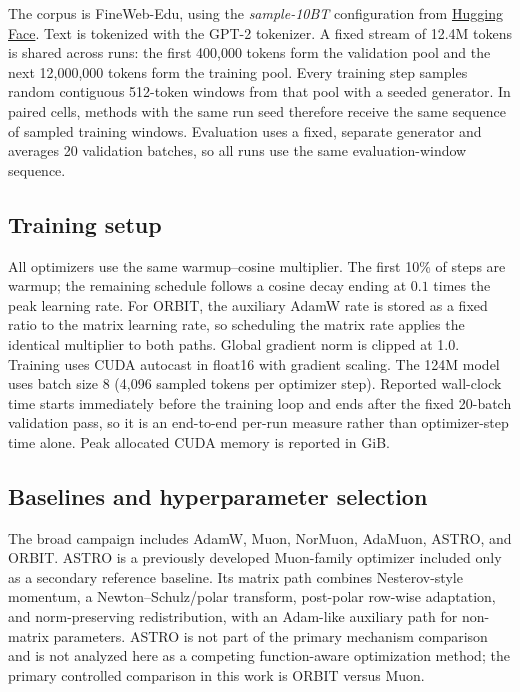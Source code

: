 The corpus is FineWeb-Edu, using the \emph{sample-10BT} configuration from \href{https://huggingface.co/datasets/HuggingFaceFW/fineweb-edu}{Hugging Face}.
Text is tokenized with the GPT-2 tokenizer. A fixed stream of 12.4M tokens is shared across
runs: the first 400,000 tokens form the validation pool and the next 12,000,000 tokens form
the training pool. Every training step samples random contiguous 512-token windows from
that pool with a seeded generator. In paired cells, methods with the same run seed therefore
receive the same sequence of sampled training windows. Evaluation uses a fixed, separate
generator and averages 20 validation batches, so all runs use the same evaluation-window
sequence.

\subsection{Training setup}
\label{sec:training-setup}
All optimizers use the same warmup--cosine multiplier. The first 10\% of steps are warmup;
the remaining schedule follows a cosine decay ending at $0.1$ times the peak learning rate.
For ORBIT, the auxiliary AdamW rate is stored as a fixed ratio to the matrix learning rate,
so scheduling the matrix rate applies the identical multiplier to both paths. Global
gradient norm is clipped at 1.0. Training uses CUDA autocast in float16 with gradient
scaling. The 124M model uses batch size 8 (4,096 sampled tokens per optimizer step).
Reported wall-clock time starts immediately before the training loop and ends after the
fixed 20-batch validation pass, so it is an end-to-end per-run measure rather than
optimizer-step time alone. Peak allocated CUDA memory is reported in GiB.

\subsection{Baselines and hyperparameter selection}
The broad campaign includes AdamW, Muon, NorMuon, AdaMuon, ASTRO, and ORBIT. ASTRO is a
previously developed Muon-family optimizer included only as a secondary reference baseline.
Its matrix path combines Nesterov-style momentum, a Newton--Schulz/polar transform,
post-polar row-wise adaptation, and norm-preserving redistribution, with an Adam-like
auxiliary path for non-matrix parameters. ASTRO is not part of the primary mechanism
comparison and is not analyzed here as a competing function-aware optimization method; the
primary controlled comparison in this work is ORBIT versus Muon.

